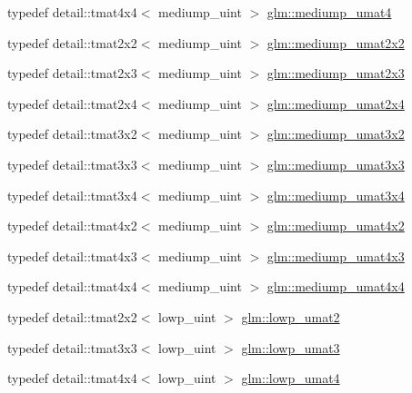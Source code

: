 \begin{DoxyCompactItemize}
typedef detail\+::tmat4x4$<$ mediump\+\_\+uint $>$ \hyperlink{group__gtc__matrix__integer_ga41f8522ec6855007e5221193b58b156b}{glm\+::mediump\+\_\+umat4}
\item 
typedef detail\+::tmat2x2$<$ mediump\+\_\+uint $>$ \hyperlink{group__gtc__matrix__integer_gad7b4dd36037f24c8c2d7cac7e8ecb729}{glm\+::mediump\+\_\+umat2x2}
\item 
typedef detail\+::tmat2x3$<$ mediump\+\_\+uint $>$ \hyperlink{group__gtc__matrix__integer_gaa377342a4abe7f415218710e531b2731}{glm\+::mediump\+\_\+umat2x3}
\item 
typedef detail\+::tmat2x4$<$ mediump\+\_\+uint $>$ \hyperlink{group__gtc__matrix__integer_ga62b45add166ab5be4e325a2cadec240d}{glm\+::mediump\+\_\+umat2x4}
\item 
typedef detail\+::tmat3x2$<$ mediump\+\_\+uint $>$ \hyperlink{group__gtc__matrix__integer_gaa8022553d8ad1a133f9ebe75a50dbee1}{glm\+::mediump\+\_\+umat3x2}
\item 
typedef detail\+::tmat3x3$<$ mediump\+\_\+uint $>$ \hyperlink{group__gtc__matrix__integer_ga51665c5e422b057ca25a67a939c78ceb}{glm\+::mediump\+\_\+umat3x3}
\item 
typedef detail\+::tmat3x4$<$ mediump\+\_\+uint $>$ \hyperlink{group__gtc__matrix__integer_gac432c4520a4843bd269d4393a19031a4}{glm\+::mediump\+\_\+umat3x4}
\item 
typedef detail\+::tmat4x2$<$ mediump\+\_\+uint $>$ \hyperlink{group__gtc__matrix__integer_gaa1c11ec784503a43fbf8f52f5ed47ef1}{glm\+::mediump\+\_\+umat4x2}
\item 
typedef detail\+::tmat4x3$<$ mediump\+\_\+uint $>$ \hyperlink{group__gtc__matrix__integer_gadf09c66253321ec625819792cacd5fc6}{glm\+::mediump\+\_\+umat4x3}
\item 
typedef detail\+::tmat4x4$<$ mediump\+\_\+uint $>$ \hyperlink{group__gtc__matrix__integer_ga27a135717a6c01fc900a8f10862718ac}{glm\+::mediump\+\_\+umat4x4}
\item 
typedef detail\+::tmat2x2$<$ lowp\+\_\+uint $>$ \hyperlink{group__gtc__matrix__integer_ga8af5e120231c533b017123546642ef18}{glm\+::lowp\+\_\+umat2}
\item 
typedef detail\+::tmat3x3$<$ lowp\+\_\+uint $>$ \hyperlink{group__gtc__matrix__integer_ga9a4fea23f614c09bd4f69300849e53b8}{glm\+::lowp\+\_\+umat3}
\item 
typedef detail\+::tmat4x4$<$ lowp\+\_\+uint $>$ \hyperlink{group__gtc__matrix__integer_ga8c3fe5b40073668893a32bd07b7a64a1}{glm\+::lowp\+\_\+umat4}
\item 

\end{DoxyCompactItemize}

